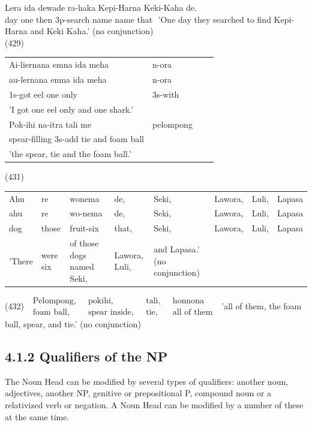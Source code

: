 \documentclass[10pt]{article}
\begin{document}
Lera ida dewade ra-haka Kepi-Harna Keki-Kaha de.\\
day one then 3p-search name name that \({ }\) 'One day they searched to find Kepi-Harna and Keki Kaha.' (no conjunction)\\
(429)

\begin{center}
\begin{tabular}{llll}
Ai-liernana emna ida meha & n-ora \\
au-lernana emna ida meha & n-ora \\
1s-got eel one only & 3s-with \\
'I got one eel only and one shark.' &  \\
Pok-ihi na-itra tali me & pelompong \\
spear-filling 3s-add tie and foam ball &  \\
'the spear, tie and the foam ball.' &  \\
\end{tabular}
\end{center}

(431)

\begin{center}
\begin{tabular}{llllllll}
Ahu & re & wonema & de, & Seki, & Lawora, & Luli, & Lapasa \\
ahu & re & wo-nema & de, & Seki, & Lawora, & Luli, & Lapasa \\
dog & those & fruit-six & that, & Seki, & Lawora, & Luli, & Lapasa \\
'There & were six & of those dogs named Seki, & Lawora, Luli, & and Lapasa.' (no conjunction) &  &  &  \\
\end{tabular}
\end{center}

(432) \(\begin{array}{llll}\text { Pelompong, } & \text { pokihi, } & \text { tali, } & \text { honnona } \\ \text { foam ball, } & \text { spear inside, } & \text { tie, } & \text { all of them }\end{array}\) 'all of them, the foam ball, spear, and tie.' (no conjunction)

\subsection*{4.1.2 Qualifiers of the NP}
The Noun Head can be modified by several types of qualifiers: another noun, adjectives, another NP, genitive or prepositional P, compound noun or a relativized verb or negation. A Noun Head can be modified by a number of these at the same time.
\end{document}
